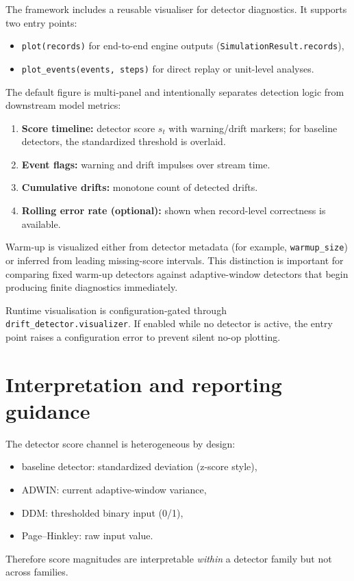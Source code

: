 The framework includes a reusable visualiser for detector diagnostics. It supports two entry points:
\begin{itemize}
\item \texttt{plot(records)} for end-to-end engine outputs (\texttt{SimulationResult.records}),
\item \texttt{plot\_events(events, steps)} for direct replay or unit-level analyses.
\end{itemize}

The default figure is multi-panel and intentionally separates detection logic from downstream model metrics:
\begin{enumerate}
\item \textbf{Score timeline:} detector score $s_t$ with warning/drift markers; for baseline detectors, the standardized threshold is overlaid.
\item \textbf{Event flags:} warning and drift impulses over stream time.
\item \textbf{Cumulative drifts:} monotone count of detected drifts.
\item \textbf{Rolling error rate (optional):} shown when record-level correctness is available.
\end{enumerate}

Warm-up is visualized either from detector metadata (for example, \texttt{warmup\_size}) or inferred from leading missing-score intervals. This distinction is important for comparing fixed warm-up detectors against adaptive-window detectors that begin producing finite diagnostics immediately.

Runtime visualisation is configuration-gated through \texttt{drift\_detector.visualizer}. If enabled while no detector is active, the entry point raises a configuration error to prevent silent no-op plotting.

\section{Interpretation and reporting guidance}
\label{sec:detector-reporting}

The detector score channel is heterogeneous by design:
\begin{itemize}
\item baseline detector: standardized deviation (z-score style),
\item ADWIN: current adaptive-window variance,
\item DDM: thresholded binary input (0/1),
\item Page--Hinkley: raw input value.
\end{itemize}
Therefore score magnitudes are interpretable \emph{within} a detector family but not across families.

